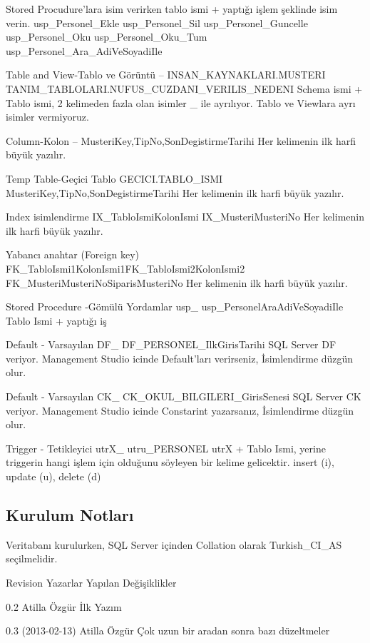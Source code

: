 \documentclass[10pt,a4paper,draft]{article}
\begin{document}
  
  Stored Procudure'lara isim verirken tablo ismi + yaptığı işlem şeklinde 
  isim verin.
		usp\_Personel\_Ekle			usp\_Personel\_Sil			 
		usp\_Personel\_Guncelle		usp\_Personel\_Oku			 
		usp\_Personel\_Oku\_Tum		usp\_Personel\_Ara\_AdiVeSoyadiIle
  
     Table and View-Tablo ve Görüntü 
     -- 
    INSAN\_KAYNAKLARI.MUSTERI 
      			TANIM\_TABLOLARI.NUFUS\_CUZDANI\_VERILIS\_NEDENI 
    Schema ismi + Tablo ismi, 2 kelimeden fazla olan isimler \_ ile 
      ayrılıyor. Tablo ve Viewlara ayrı isimler vermiyoruz.		  
  
     Column-Kolon 
     -- 
    MusteriKey,TipNo,SonDegistirmeTarihi 
    Her kelimenin ilk harfi büyük yazılır. 
  
     Temp Table-Geçici Tablo 
     GECICI.TABLO\_ISMI 
    MusteriKey,TipNo,SonDegistirmeTarihi 
    Her kelimenin ilk harfi büyük yazılır. 
  
     Index isimlendirme 
     IX\_TabloIsmiKolonIsmi 
     IX\_MusteriMusteriNo 
    Her kelimenin ilk harfi büyük yazılır. 
  
     Yabancı anahtar (Foreign key) 
     FK\_TabloIsmi1KolonIsmi1FK\_TabloIsmi2KolonIsmi2 
     FK\_MusteriMusteriNoSiparisMusteriNo 
    Her kelimenin ilk harfi büyük yazılır. 
  
     Stored Procedure -Gömülü Yordamlar 
     usp\_ 
     usp\_PersonelAraAdiVeSoyadiIle 
     Tablo Ismi + yaptığı iş 		  
  
    Default - Varsayılan 
     DF\_ 
     DF\_PERSONEL\_IlkGirisTarihi 
     SQL Server DF veriyor. Management Studio icinde Default'ları 
      verirseniz, İsimlendirme düzgün olur. 		  
  
     Default - Varsayılan 
     CK\_ 
     CK\_OKUL\_BILGILERI\_GirisSenesi 
     SQL Server CK veriyor. Management Studio icinde Constarint 
      yazarsanız, İsimlendirme düzgün olur. 				 
  
     Trigger - Tetikleyici 
     utrX\_ 
     utru\_PERSONEL 
      utrX + Tablo Ismi, yerine triggerin hangi işlem için olduğunu 
      söyleyen bir kelime gelicektir. insert (i), update (u), delete (d)
  
\subsection{Kurulum Notları}
Veritabanı kurulurken, SQL Server içinden Collation olarak Turkish\_CI\_AS 
seçilmelidir. 
  
      
      
Revision 
Yazarlar 
Yapılan Değişiklikler 
  
     0.2  
     Atilla Özgür 
    İlk Yazım 
    
  
     0.3 (2013-02-13) 
     Atilla Özgür 
    Çok uzun bir aradan sonra bazı düzeltmeler 
    
    
\end{document}
